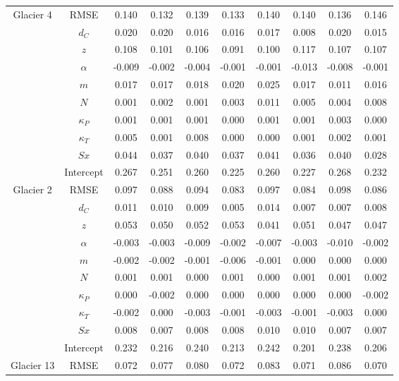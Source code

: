 \documentclass[12pt]{article}
\begin{document}
\begin{landscape}
\begin{table}
\begin{tabular}{cccccccccc}
\multirow{-10}{*}{\cellcolor[HTML]{EFEFEF}Glacier 4} & RMSE & 0.140 & 0.132 & 0.139 & 0.133 & 0.140 & 0.140 & 0.136 & 0.146 \\
 & $d_C$ & 0.020 & 0.020 & 0.016 & 0.016 & 0.017 & 0.008 & 0.020 & 0.015 \\
 & $z$ & 0.108 & 0.101 & 0.106 & 0.091 & 0.100 & 0.117 & 0.107 & 0.107 \\
 & $\alpha$ & -0.009 & -0.002 & -0.004 & -0.001 & -0.001 & -0.013 & -0.008 & -0.001 \\
 & $m$ & 0.017 & 0.017 & 0.018 & 0.020 & 0.025 & 0.017 & 0.011 & 0.016 \\
 & $N$ & 0.001 & 0.002 & 0.001 & 0.003 & 0.011 & 0.005 & 0.004 & 0.008 \\
 & $\kappa_P$ & 0.001 & 0.001 & 0.001 & 0.000 & 0.001 & 0.001 & 0.003 & 0.000 \\
 & $\kappa_T$ & 0.005 & 0.001 & 0.008 & 0.000 & 0.000 & 0.001 & 0.002 & 0.001 \\
 & $Sx$ & 0.044 & 0.037 & 0.040 & 0.037 & 0.041 & 0.036 & 0.040 & 0.028 \\
 & Intercept & 0.267 & 0.251 & 0.260 & 0.225 & 0.260 & 0.227 & 0.268 & 0.232 \\
\multirow{-10}{*}{Glacier 2} & RMSE & 0.097 & 0.088 & 0.094 & 0.083 & 0.097 & 0.084 & 0.098 & 0.086 \\
 
 & $d_C$ & 0.011 & 0.010 & 0.009 & 0.005 & 0.014 & 0.007 & 0.007 & 0.008 \\
 
 & $z$ & 0.053 & 0.050 & 0.052 & 0.053 & 0.041 & 0.051 & 0.047 & 0.047 \\
 
 & $\alpha$ & -0.003 & -0.003 & -0.009 & -0.002 & -0.007 & -0.003 & -0.010 & -0.002 \\
 
 & $m$ & -0.002 & -0.002 & -0.001 & -0.006 & -0.001 & 0.000 & 0.000 & 0.000 \\
 
 & $N$ & 0.001 & 0.001 & 0.000 & 0.001 & 0.000 & 0.001 & 0.001 & 0.002 \\
 
 & $\kappa_P$ & 0.000 & -0.002 & 0.000 & 0.000 & 0.000 & 0.000 & 0.000 & -0.002 \\
 
 & $\kappa_T$ & -0.002 & 0.000 & -0.003 & -0.001 & -0.003 & -0.001 & -0.003 & 0.000 \\
 
 & $Sx$ & 0.008 & 0.007 & 0.008 & 0.008 & 0.010 & 0.010 & 0.007 & 0.007 \\
 
 & Intercept & 0.232 & 0.216 & 0.240 & 0.213 & 0.242 & 0.201 & 0.238 & 0.206 \\
 
\multirow{-10}{*}{\cellcolor[HTML]{EFEFEF}Glacier 13} & RMSE & 0.072 & 0.077 & 0.080 & 0.072 & 0.083 & 0.071 & 0.086 & 0.070
\end{tabular}
\end{table}
\end{landscape}
\end{document}
